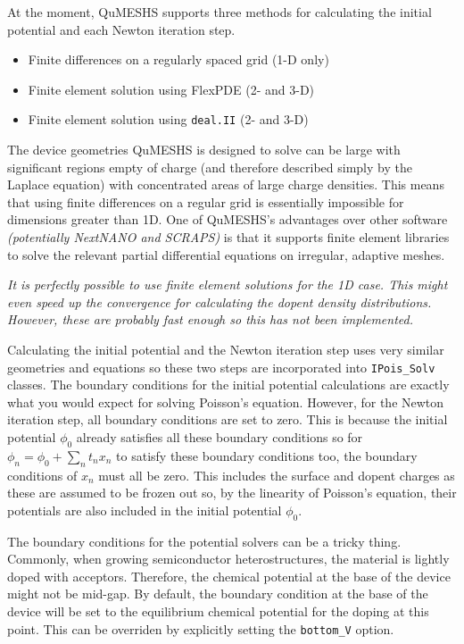 \documentclass[12pt]{article}
\newcommand{\red}[1]{{\color{red} \it #1}}
\begin{document}
{At the moment, QuMESHS supports three methods for calculating the initial potential and each
Newton iteration step.
%
\begin{itemize}
    \item Finite differences on a regularly spaced grid (1-D only)
    \item Finite element solution using FlexPDE (2- and 3-D)
    \item Finite element solution using \texttt{deal.II} (2- and 3-D)
\end{itemize}
%
The device geometries QuMESHS is designed to solve can be large with significant regions empty
of charge (and therefore described simply by the Laplace equation) with concentrated areas of
large charge densities.  This means that using finite differences on a regular grid is essentially
impossible for dimensions greater than 1D.  One of QuMESHS's advantages over other software
\red{(potentially NextNANO and SCRAPS)} is that it supports finite element libraries to solve
the relevant partial differential equations on irregular, adaptive meshes.

\red{It is perfectly possible to use finite element solutions for the 1D case.  This might even
speed up the convergence for calculating the dopent density distributions.  However, these are
probably fast enough so this has not been implemented.}

Calculating the initial potential and the Newton iteration step uses very similar geometries
and equations so these two steps are incorporated into \texttt{IPois\_Solv} classes.  The
boundary conditions for the initial potential calculations are exactly what you would expect
for solving Poisson's equation.  However, for the Newton iteration step, all boundary
conditions are set to zero.  This is because the initial potential $\phi_0$ already satisfies
all these boundary conditions so for $\phi_n = \phi_0 + \sum_n t_n x_n$ to satisfy these
boundary conditions too, the boundary conditions of $x_n$ must all be zero.  This includes
the surface and dopent charges as these are assumed to be frozen out so, by the linearity
of Poisson's equation, their potentials are also included in the initial potential $\phi_0$.

The boundary conditions for the potential solvers can be a tricky thing.  Commonly, when growing
semiconductor heterostructures, the material is lightly doped with acceptors.  Therefore, the
chemical potential at the base of the device might not be mid-gap.  By default, the boundary
condition at the base of the device will be set to the equilibrium chemical potential for the
doping at this point. This can be overriden by explicitly setting the \texttt{bottom\_V} option.

}
\end{document}
